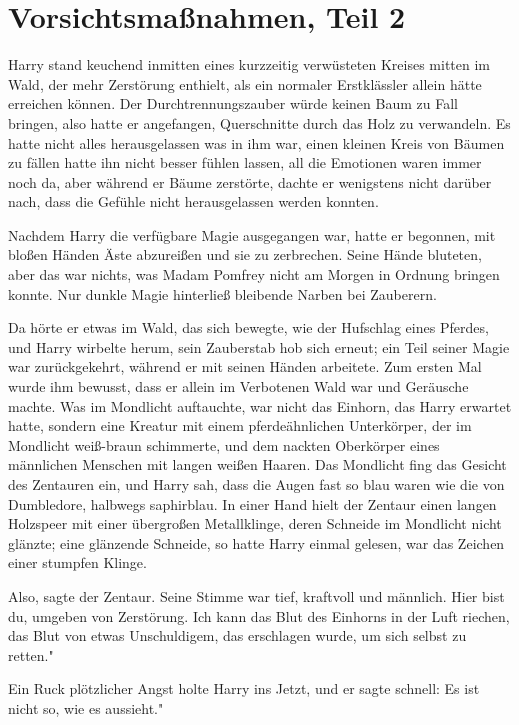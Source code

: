 \chapter{Vorsichtsmaßnahmen, Teil 2}

Harry stand keuchend inmitten eines kurzzeitig verwüsteten Kreises mitten im
Wald, der mehr Zerstörung enthielt, als ein  normaler Erstklässler allein hätte
erreichen können. Der Durchtrennungszauber würde keinen Baum zu Fall bringen,
also hatte er angefangen, Querschnitte durch das Holz zu verwandeln. Es hatte
nicht alles herausgelassen was in ihm war, einen kleinen Kreis von Bäumen zu
fällen hatte ihn nicht besser fühlen lassen, all die Emotionen waren immer noch
da, aber während er Bäume zerstörte, dachte er wenigstens nicht darüber nach,
dass die Gefühle nicht herausgelassen werden konnten.

Nachdem Harry die verfügbare Magie ausgegangen war, hatte er begonnen, mit
bloßen Händen Äste abzureißen und sie zu zerbrechen. Seine Hände bluteten, aber
das war nichts, was Madam Pomfrey nicht am Morgen in Ordnung bringen konnte. Nur
dunkle Magie hinterließ bleibende Narben bei Zauberern.

Da hörte er etwas im Wald, das sich bewegte, wie der Hufschlag eines Pferdes,
und Harry wirbelte herum, sein Zauberstab hob sich erneut; ein Teil seiner Magie
war zurückgekehrt, während er mit seinen Händen arbeitete. Zum ersten Mal wurde
ihm bewusst, dass er allein im Verbotenen Wald war und Geräusche machte. Was im
Mondlicht auftauchte, war nicht das Einhorn, das Harry erwartet hatte, sondern
eine Kreatur mit einem pferdeähnlichen Unterkörper, der im Mondlicht weiß-braun
schimmerte, und dem nackten Oberkörper eines männlichen Menschen mit langen
weißen Haaren. Das Mondlicht fing das Gesicht des Zentauren ein, und Harry sah,
dass die Augen fast so blau waren wie die von Dumbledore, halbwegs saphirblau.
In einer Hand hielt der Zentaur einen langen Holzspeer mit einer übergroßen
Metallklinge, deren Schneide im Mondlicht nicht glänzte; eine glänzende
Schneide, so hatte Harry einmal gelesen, war das Zeichen einer stumpfen Klinge.

\glqq Also\grqq{}, sagte der Zentaur. Seine Stimme war tief, kraftvoll und
männlich. \glqq Hier bist du, umgeben von Zerstörung. Ich kann das Blut des
Einhorns in der Luft riechen, das Blut von etwas Unschuldigem, das erschlagen
wurde, um sich selbst zu retten."

Ein Ruck plötzlicher Angst holte Harry ins Jetzt, und er sagte schnell: \glqq Es
ist nicht so, wie es aussieht."

